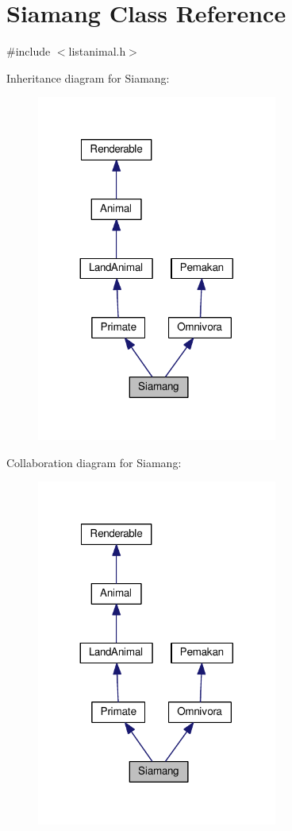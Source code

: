 \hypertarget{classSiamang}{}\section{Siamang Class Reference}
\label{classSiamang}


{\ttfamily \#include $<$listanimal.\+h$>$}



Inheritance diagram for Siamang\+:
\nopagebreak
\begin{figure}[H]
\begin{center}
\leavevmode
\includegraphics[width=224pt]{classSiamang__inherit__graph}
\end{center}
\end{figure}


Collaboration diagram for Siamang\+:
\nopagebreak
\begin{figure}[H]
\begin{center}
\leavevmode
\includegraphics[width=224pt]{classSiamang__coll__graph}
\end{center}
\end{figure}
